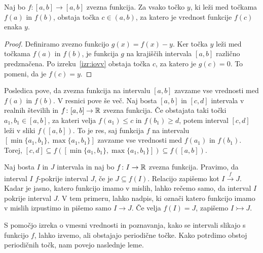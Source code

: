 \documentclass[../TG_magistrsko_delo_sections.tex]{subfiles}
\begin{document}
\begin{posledica}\label{pos:vmesnavrednost}
Naj bo $f \colon [a, b] \to [a, b]$ zvezna funkcija. Za vsako točko $y$, ki leži med točkama $f(a)$ in $f(b)$, obstaja točka $c \in (a, b)$, za katero je vrednost funkcije $f(c)$ enaka $y$.
\end{posledica}
\begin{proof}
Definiramo zvezno funkcijo $g(x) = f(x) - y$. Ker točka $y$ leži med točkama $f(a)$ in $f(b)$, je funkcija $g$ na krajiščih intervala $[a, b]$ različno predznačena. Po izreku~\ref{izr:iovv} obstaja točka $c$, za katero je $g(c) = 0$. To pomeni, da je $f(c) = y$.
\end{proof}
Posledica pove, da zvezna funkcija na intervalu $[a, b]$ zavzame vse vrednosti med $f(a)$ in $f(b)$. V resnici pove še več. Naj bosta $[a, b]$ in $[c, d]$ intervala v realnih številih in $f \colon [a, b] \to \mathbb R$ zvezna funkcija. Če obstajata taki točki $a_1, b_1 \in [a, b]$, za kateri velja $f(a_1) \leq c$ in $f(b_1) \geq d$, potem interval $[c, d]$ leži v sliki $f([a, b])$. To je res, saj funkcija $f$ na intervalu $[\min\{a_1, b_1\}, \max\{a_1, b_1\}]$ zavzame vse vrednosti med $f(a_1)$ in $f(b_1)$. Torej, $[c, d] \subseteq f([\min\{a_1, b_1\}, \max\{a_1, b_1\}]) \subseteq f([a, b])$.

\begin{definicija}\label{def:pokritja}
Naj bosta $I$ in $J$ intervala in naj bo $f \colon I \to \mathbb R$ zvezna funkcija. Pravimo, da interval $I$ $f$-pokrije interval $J$, če je $J \subseteq f(I)$. Relacijo zapišemo kot $I \xrightarrow{f} J$. Kadar je jasno, katero funkcijo imamo v mislih, lahko rečemo samo, da interval $I$ pokrije interval $J$. V tem primeru, lahko nadpis, ki označi katero funkcijo imamo v mislih izpustimo in pišemo samo $I \to J$. Če velja $f(I) =J$, zapišemo $I \rightarrowtail J$.
\end{definicija}
S pomočjo izreka o vmesni vrednosti in poznavanja, kako se intervali slikajo s funkcijo $f$, lahko izvemo, ali obstajajo periodične točke. Kako potrdimo obstoj periodičnih točk, nam povejo naslednje leme.
\end{document}
